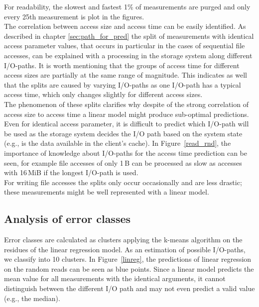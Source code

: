 \documentclass{superfri}
\begin{document}
For readability, the slowest and fastest 1\% of measurements are purged and only every 25th measurement is plot in the figures.\\
The correlation between access size and access time can be easily identified.
As described in chapter \ref{sec:path_for_pred} the split of measurements with identical access parameter values, that occurs in particular in the cases of sequential file accesses, can be explained with a processing in the storage system along different I/O-paths.
It is worth mentioning that the groups of access time for different access sizes are partially at the same range of magnitude.
This indicates as well that the splits are caused by varying I/O-paths as one I/O-path has a typical access time, which only changes slightly for different access sizes.\\
The phenomenon of these splits clarifies why despite of the strong correlation of access size to access time a linear model might produce sub-optimal predictions. 
Even for identical access parameter, it is difficult to predict which I/O-path will be used as the storage system decides the I/O path based on the system state (e.g., is the data available in the client's cache).
In Figure~\ref{read_rnd}, the importance of knowledge about I/O-paths for the  access time prediction can be seen, for example file accesses of only 1\,B can be processed as slow as accesses with 16\,MiB if the longest I/O-path is used.\\
For writing file accesses the splits only occur occasionally and are less drastic; these measurements might be well represented with a linear model.

\subsection{Analysis of error classes}
Error classes are calculated as clusters applying the k-means algorithm on the residues of the linear regression model.
As an estimation of possible I/O-paths, we classify into 10 clusters.
In Figure~\ref{linreg}, the predictions of linear regression on the random reads can be seen as blue points.
Since a linear model predicts the mean value for all measurements with the identical arguments, it cannot distinguish between the different I/O path and may not even predict a valid value (e.g., the median).
\end{document}
